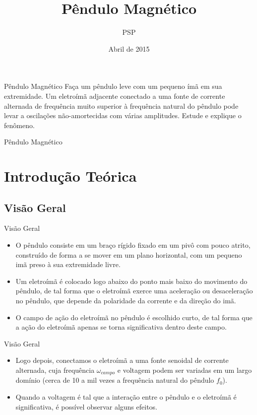 \documentclass{beamer}
\title[Pêndulo Magnético]{Pêndulo Magnético}
\author{PSP}
\date{Abril de 2015}
\begin{document}
\begin{frame}
  \titlepage
\end{frame}

\begin{frame}{Pêndulo Magnético}
\justifying
Faça um pêndulo leve com um pequeno ímã em sua extremidade. Um eletroímã adjacente conectado a uma fonte de corrente alternada de frequência muito superior à frequência natural do pêndulo pode levar a oscilações não-amortecidas com várias amplitudes. Estude e explique o fenômeno.
\end{frame}

\begin{frame}{Pêndulo Magnético}
  \tableofcontents
\end{frame}

\section{Introdução Teórica}

\subsection{Visão Geral}
\begin{frame}{Visão Geral}
\begin{itemize}
\item O pêndulo consiste em um braço rígido fixado em um pivô com pouco atrito, construído de forma a se mover em um plano horizontal, com um pequeno imã preso à sua extremidade livre. 
\item Um eletroímã é colocado logo abaixo do ponto mais baixo do movimento do pêndulo, de tal forma que o eletroímã exerce uma aceleração ou desaceleração no pêndulo, que depende da polaridade da corrente e da direção do imã.
\item O campo de ação do eletroímã no pêndulo é escolhido curto, de tal forma que a ação do eletroímã apenas se torna significativa dentro deste campo.
\end{itemize}
\end{frame}

\begin{frame}{Visão Geral}
\begin{itemize}
\item Logo depois, conectamos o eletroímã a uma fonte senoidal de corrente alternada, cuja frequência $\omega_{campo}$ e voltagem podem ser variadas em um largo domínio (cerca de 10 a mil vezes a frequência natural do pêndulo $f_0$).
\item Quando a voltagem é tal que a interação entre o pêndulo e o eletroímã é significativa, é possível observar alguns efeitos.
\end{itemize}
\end{frame}
\end{document}
